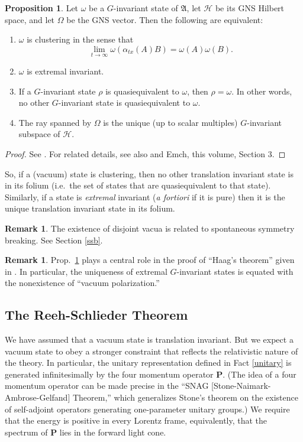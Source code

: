 \documentclass[12pt]{article}
\newcommand{\alg}[1]{\mathfrak{#1}}
\theoremstyle{definition}
\newtheorem{prop}[thm]{Proposition}
\theoremstyle{definition}
\newtheorem{note}[thm]{Remark}
\theoremstyle{remark}
\def\2#1{{\mathcal #1}}
\def\a{\alpha} \def\b{\beta} \def\g{\gamma} \def\d{\delta}
\def\om{\omega} \def\Om{\Omega} \def\dd{\partial} \def\D{\Delta}
\begin{document}
\begin{prop} Let $\om$ be a $G$-invariant state of $\alg{A}$, let $\2H$ be its GNS
  Hilbert space, and let $\Om$ be the GNS vector.  Then the following are equivalent:
\begin{enumerate}
\item $\om$ is clustering in the sense that
$$ \lim _{t\to \infty }\om (\a _{tx}(A)B)=\om (A)\om (B) .$$
\item $\om$ is extremal invariant.
\item If a $G$-invariant state $\rho$ is quasiequivalent to $\om$,
  then $\rho =\om$.  In other words, no other $G$-invariant state is
  quasiequivalent to $\om$.
\item The ray spanned by $\Om$ is the unique (up to scalar multiples) $G$-invariant
  subspace of $\2H$.
\end{enumerate} \label{G-inv}
\end{prop}

\begin{proof} See \cite{storm}.  For related details,
  see also \cite[pp.\ 183, 287]{emch} and Emch, this
  volume, Section 3.
\end{proof}

So, if a (vacuum) state is clustering, then no other translation
invariant state is in its folium (i.e.\ the set of states that are
quasiequivalent to that state).  Similarly, if a state is
\emph{extremal} invariant (\emph{a fortiori} if it is pure) then it is
the unique translation invariant state in its folium.

\begin{note} The existence of disjoint vacua is related to spontaneous
  symmetry breaking.  See Section \ref{ssb}.  \end{note}

\begin{note} Prop.\ \ref{G-inv} plays a central role in the proof of
  ``Haag's theorem'' given in \cite[p.\ 248]{emch}.  In particular,
  the uniqueness of extremal $G$-invariant states is equated with the
  nonexistence of ``vacuum polarization.''
\end{note}


\subsection{The Reeh-Schlieder Theorem} \label{rst}

We have assumed that a vacuum state is translation invariant.  But we
expect a vacuum state to obey a stronger constraint that reflects the
relativistic nature of the theory.  In particular, the unitary
representation defined in Fact \ref{unitary} is generated
infinitesimally by the four momentum operator $\mathbf{P}$.  (The idea
of a four momentum operator can be made precise in the ``SNAG
[Stone-Naimark-Ambrose-Gelfand] Theorem,'' which generalizes Stone's
theorem on the existence of self-adjoint operators generating
one-parameter unitary groups.)  We require that the energy is positive
in every Lorentz frame, equivalently, that the spectrum of
$\mathbf{P}$ lies in the forward light cone.
\end{document}
